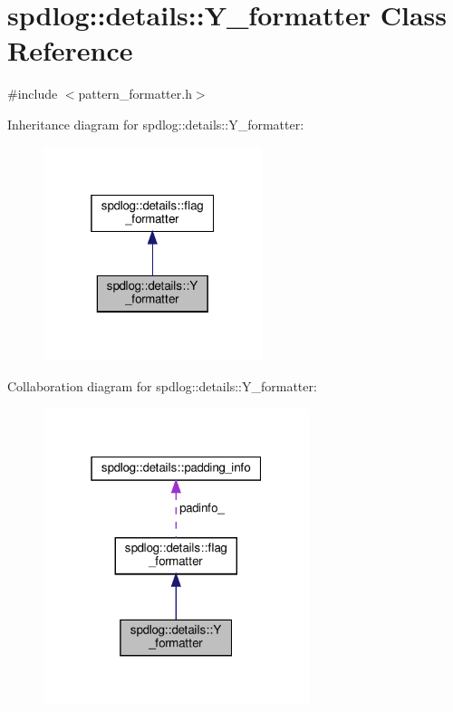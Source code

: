 \hypertarget{classspdlog_1_1details_1_1_y__formatter}{}\section{spdlog\+:\+:details\+:\+:Y\+\_\+formatter Class Reference}
\label{classspdlog_1_1details_1_1_y__formatter}


{\ttfamily \#include $<$pattern\+\_\+formatter.\+h$>$}



Inheritance diagram for spdlog\+:\+:details\+:\+:Y\+\_\+formatter\+:
\nopagebreak
\begin{figure}[H]
\begin{center}
\leavevmode
\includegraphics[width=181pt]{classspdlog_1_1details_1_1_y__formatter__inherit__graph}
\end{center}
\end{figure}


Collaboration diagram for spdlog\+:\+:details\+:\+:Y\+\_\+formatter\+:
\nopagebreak
\begin{figure}[H]
\begin{center}
\leavevmode
\includegraphics[width=220pt]{classspdlog_1_1details_1_1_y__formatter__coll__graph}
\end{center}
\end{figure}
